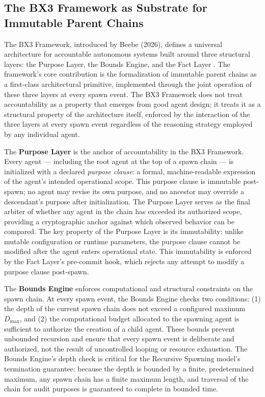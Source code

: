 {{\subsection{The BX3 Framework as Substrate for Immutable Parent Chains}
\label{sec:bx3}

The BX3 Framework, introduced by Beebe (2026), defines a universal architecture for accountable autonomous systems built around three structural layers: the Purpose Layer, the Bounds Engine, and the Fact Layer \cite{bx3framework2026}. The framework's core contribution is the formalization of immutable parent chains as a first-class architectural primitive, implemented through the joint operation of these three layers at every spawn event. The BX3 Framework does not treat accountability as a property that emerges from good agent design; it treats it as a structural property of the architecture itself, enforced by the interaction of the three layers at every spawn event regardless of the reasoning strategy employed by any individual agent.

The \textbf{Purpose Layer} is the anchor of accountability in the BX3 Framework. Every agent — including the root agent at the top of a spawn chain — is initialized with a declared \textit{purpose clause}: a formal, machine-readable expression of the agent's intended operational scope. This purpose clause is immutable post-spawn; no agent may revise its own purpose, and no ancestor may override a descendant's purpose after initialization. The Purpose Layer serves as the final arbiter of whether any agent in the chain has exceeded its authorized scope, providing a cryptographic anchor against which observed behavior can be compared. The key property of the Purpose Layer is its immutability: unlike mutable configuration or runtime parameters, the purpose clause cannot be modified after the agent enters operational state. This immutability is enforced by the Fact Layer's pre-commit hook, which rejects any attempt to modify a purpose clause post-spawn.

The \textbf{Bounds Engine} enforces computational and structural constraints on the spawn chain. At every spawn event, the Bounds Engine checks two conditions: (1) the depth of the current spawn chain does not exceed a configured maximum $D_{\max}$, and (2) the computational budget allocated to the spawning agent is sufficient to authorize the creation of a child agent. These bounds prevent unbounded recursion and ensure that every spawn event is deliberate and authorized, not the result of uncontrolled looping or resource exhaustion. The Bounds Engine's depth check is critical for the Recursive Spawning model's termination guarantee: because the depth is bounded by a finite, predetermined maximum, any spawn chain has a finite maximum length, and traversal of the chain for audit purposes is guaranteed to complete in bounded time.

}}
